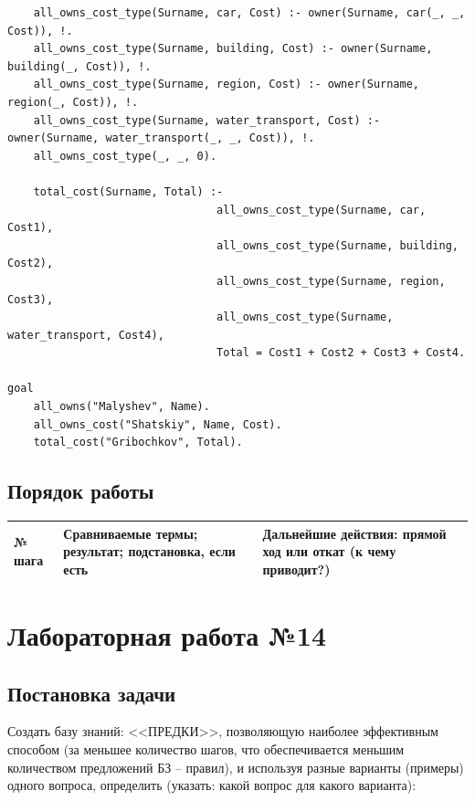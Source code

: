 \documentclass[12pt]{report}
\begin{document}
\begin{lstlisting}
	all_owns_cost_type(Surname, car, Cost) :- owner(Surname, car(_, _, Cost)), !.
	all_owns_cost_type(Surname, building, Cost) :- owner(Surname, building(_, Cost)), !.
	all_owns_cost_type(Surname, region, Cost) :- owner(Surname, region(_, Cost)), !.
	all_owns_cost_type(Surname, water_transport, Cost) :- owner(Surname, water_transport(_, _, Cost)), !.
	all_owns_cost_type(_, _, 0).

	total_cost(Surname, Total) :- 
								all_owns_cost_type(Surname, car, Cost1),
								all_owns_cost_type(Surname, building, Cost2),
								all_owns_cost_type(Surname, region, Cost3),
								all_owns_cost_type(Surname, water_transport, Cost4),
								Total = Cost1 + Cost2 + Cost3 + Cost4.

goal
	all_owns("Malyshev", Name).
	all_owns_cost("Shatskiy", Name, Cost).
	total_cost("Gribochkov", Total).
\end{lstlisting}

\section*{Порядок работы}

\begin{table}[H]
	\begin{center}
		\begin{tabular}{|p{1 cm}|p{10 cm}|p{8 cm}|}
			\hline
			№ шага & Сравниваемые термы; результат; подстановка, если есть & Дальнейшие действия: прямой ход или откат (к чему приводит?) \\
			\hline 
			
		\end{tabular}
	\end{center}
\end{table} 

\chapter*{Лабораторная работа №14}

\section*{Постановка задачи}

Создать базу знаний: <<ПРЕДКИ>>, позволяющую наиболее эффективным способом (за меньшее количество шагов, что обеспечивается меньшим количеством предложений БЗ – правил), и используя разные варианты (примеры) одного вопроса, определить (указать: какой вопрос для какого варианта):
\end{document}
